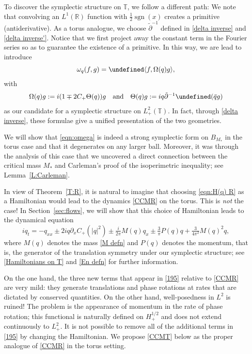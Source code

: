 \documentclass{amsart}
\numberwithin{equation}{section}
\theoremstyle{definition}
\newcommand{\om}{\omega}
\newcommand{\Om}{\Omega}
\newcommand{\R}{\mathbb{R}}
\newcommand{\T}{\mathbb{T}}
\newcommand{\dd}{\partial}
\newcommand{\lan}{\langle}
\newcommand{\ran}{\rangle}
\DeclareMathOperator{\sgn}{sgn}
\let\Re=\undefined\DeclareMathOperator{\Re}{Re}
\newcommand{\qtq}[1]{\quad\text{#1}\quad}
\begin{document}
To discover the symplectic structure on $\T$, we follow a different path: We note that convolving an $L^1(\R)$ function with $\frac12\sgn(x)$ creates a primitive (antiderivative).  As a torus analogue, we choose $\tilde\partial^{-1}$ defined in \eqref{delta inverse} and \eqref{delta inverse'}.  Notice that we first project away the constant term in the Fourier series so as to guarantee the existence of a primitive.  In this way, we are lead to introduce
\begin{equation}\label{eqn:omega}
\om_q(f,g)=\Re\lan f,\Om (q)g\ran,
\end{equation}
with
\begin{equation}\label{eqn:S_T}
\Om (q)g:=i(1\mp2 C_+ \Theta (q))g \qtq{and} \Theta (q)g:=iq\tilde{\dd}^{-1}\Re(\bar{q}g)
\end{equation}
as our candidate for a symplectic structure on $L^2_+(\T)$.  In fact, through \eqref{delta inverse}, these formulae give a unified presentation of the two geometries. 

We will show that \eqref{eqn:omega} is indeed a strong symplectic form on $B_{M_*}$ in the torus case and that it degenerates on any larger ball.  Moreover, it was through the analysis of this case that we uncovered a direct connection between the critical mass $M_*$ and Carleman's proof of the isoperimetric inequality; see Lemma~\ref{L:Carleman}.

In view of Theorem~\ref{T:R}, it is natural to imagine that choosing \eqref{eqn:H(q) R} as a Hamiltonian would lead to the dynamics \eqref{CCMR} on the torus.  This is \emph{not} the case!  In Section~\ref{sec:flows}, we will show that this choice of Hamiltonian leads to the dynamical equation
\begin{equation}\label{195}
i q_t = - q_{xx} \pm 2i q \partial_x C_+(|q|^2) \pm \tfrac{i}{2\pi} M(q) q_x \pm\tfrac{3}{\pi} P(q) q + \tfrac{3}{4\pi^2} M(q)^2 q,
\end{equation}
where $M(q)$ denotes the mass \eqref{M defn} and $P(q)$ denotes the momentum, that is, the generator of the translation symmetry under our symplectic structure; see \eqref{Hamiltonians on T} and \eqref{En defn} for further information.

On the one hand, the three new terms that appear in \eqref{195} relative to \eqref{CCMR} are very mild: they generate translations and phase rotations at rates that are dictated by conserved quantities.  On the other hand, well-posedness in $L^2$ is ruined!  The problem is the appearance of momentum in the rate of phase rotation; this functional is naturally defined on $H^{1/2}_+$ and does not extend continuously to $L^2_+$.
It is not possible to remove all of the additional terms in \eqref{195} by changing the Hamiltonian.  We propose \eqref{CCMT} below as the proper analogue of \eqref{CCMR} in the torus setting.
\end{document}
